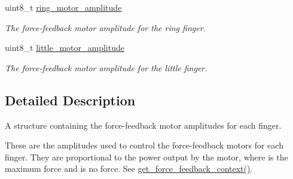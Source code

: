 \begin{DoxyCompactItemize}
\mbox{\label{struct_force_feedback_context_a6db1fbad64ff64e0434a8d171136b5f7}} 
uint8\+\_\+t \hyperlink{struct_force_feedback_context_a6db1fbad64ff64e0434a8d171136b5f7}{ring\+\_\+motor\+\_\+amplitude}
\begin{DoxyCompactList}\small\item\em The force-\/feedback motor amplitude for the ring finger. \end{DoxyCompactList}\item 
\mbox{\label{struct_force_feedback_context_a0ba6fcf3796d01299dfe876954671251}} 
uint8\+\_\+t \hyperlink{struct_force_feedback_context_a0ba6fcf3796d01299dfe876954671251}{little\+\_\+motor\+\_\+amplitude}
\begin{DoxyCompactList}\small\item\em The force-\/feedback motor amplitude for the little finger. \end{DoxyCompactList}\end{DoxyCompactItemize}


\subsection{Detailed Description}
A structure containing the force-\/feedback motor amplitudes for each finger. 

These are the amplitudes used to control the force-\/feedback motors for each finger. They are proportional to the power output by the motor, where {} is the maximum force and {} is no force. See {\ttfamily \hyperlink{group__force_feedback_control_ga6017d2145085cfc8f6d455a29006a640}{get\+\_\+force\+\_\+feedback\+\_\+context()}}. 